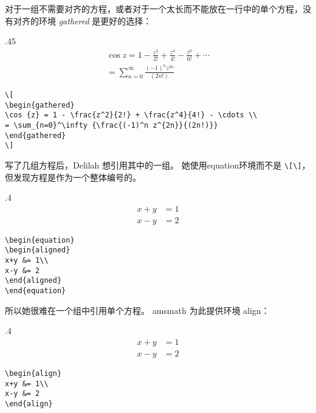 对于一组不需要对齐的方程，或者对于一个太长而不能放在一行中的单个方程，没有对齐的环境 \emph{gathered} 是更好的选择：
\begin{miniexammar}{.45\textandmarginlen}{
\[
\begin{gathered}
\cos {z} = 1 - \frac{z^2}{2!} + \frac{z^4}{4!} - \frac{z^6}{6!} + \cdots \\
= \sum_{n=0}^\infty {\frac{(-1)^n z^{2n}}{(2n!)}}
\end{gathered}
\]
}
\begin{lstlisting}
\[
\begin{gathered}
\cos {z} = 1 - \frac{z^2}{2!} + \frac{z^4}{4!} - \cdots \\
= \sum_{n=0}^\infty {\frac{(-1)^n z^{2n}}{(2n!)}}
\end{gathered}
\]
\end{lstlisting}
\end{miniexammar}

写了几组方程后，Delilah 想引用其中的一组。 她使用equation环境而不是 \verb=\[\]=，但发现方程是作为一个整体编号的。
\begin{miniexammar}{.4\textandmarginlen}{
\begin{equation}
\begin{aligned}
x+y &= 1\\
x-y &= 2
\end{aligned}
\end{equation}
}
\begin{lstlisting}
\begin{equation}
\begin{aligned}
x+y &= 1\\
x-y &= 2
\end{aligned}
\end{equation}
\end{lstlisting}
\end{miniexammar}
所以她很难在一个组中引用单个方程。 amsmath 为此提供环境 align：

\begin{miniexammar}{.4\textandmarginlen}{
\begin{align}
x+y &= 1\\
x-y &= 2
\end{align}
}
\begin{lstlisting}
\begin{align}
x+y &= 1\\
x-y &= 2
\end{align}
\end{lstlisting}
\end{miniexammar}

